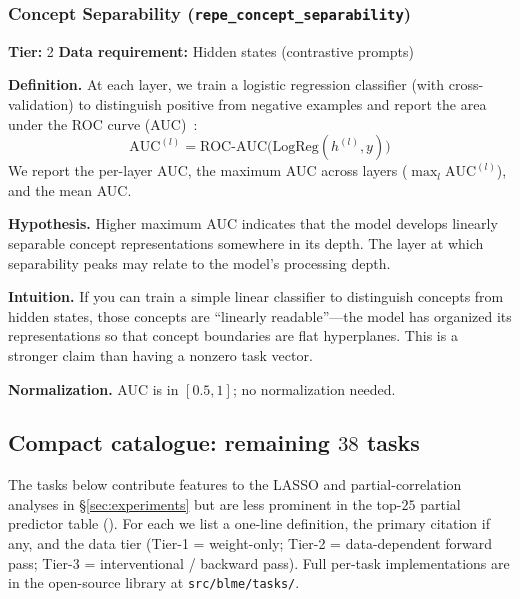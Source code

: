\documentclass[preprint]{neurips_2025}
\begin{document}
\subsubsection{Concept Separability (\texttt{repe\_concept\_separability})}
\label{app:separability}

\textbf{Tier:} 2 \quad \textbf{Data requirement:} Hidden states (contrastive prompts)

\textbf{Definition.}
At each layer, we train a logistic regression classifier (with cross-validation) to distinguish positive from negative examples and report the area under the ROC curve (AUC)~\citep{zou2023representation}:
\begin{equation}
  \text{AUC}^{(l)} = \text{ROC-AUC}\!\bigl(\text{LogReg}(h^{(l)}, y)\bigr)
\end{equation}
We report the per-layer AUC, the maximum AUC across layers ($\max_l \text{AUC}^{(l)}$), and the mean AUC.

\textbf{Hypothesis.}
Higher maximum AUC indicates that the model develops linearly separable concept representations somewhere in its depth. The layer at which separability peaks may relate to the model's processing depth.

\textbf{Intuition.}
If you can train a simple linear classifier to distinguish concepts from hidden states, those concepts are ``linearly readable''---the model has organized its representations so that concept boundaries are flat hyperplanes. This is a stronger claim than having a nonzero task vector.

\textbf{Normalization.} AUC is in $[0.5, 1]$; no normalization needed.

\subsection{Compact catalogue: remaining $38$ tasks}
\label{app:task-catalogue}

The tasks below contribute features to the LASSO and partial-correlation analyses in \S\ref{sec:experiments} but are less prominent in the top-$25$ partial predictor table (). For each we list a one-line definition, the primary citation if any, and the data tier (Tier-1 = weight-only; Tier-2 = data-dependent forward pass; Tier-3 = interventional / backward pass). Full per-task implementations are in the open-source library at \texttt{src/blme/tasks/}.
\end{document}

